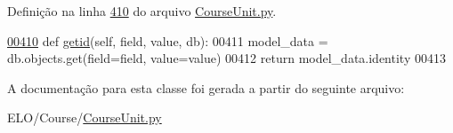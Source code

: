 Definição na linha \hyperlink{CourseUnit_8py_source_l00410}{410} do arquivo \hyperlink{CourseUnit_8py_source}{Course\+Unit.\+py}.


\begin{DoxyCode}
\hypertarget{classCourse_1_1CourseUnit_1_1PersCourse_l00410}{}\hyperlink{classCourse_1_1CourseUnit_1_1PersCourse_acfe23f8591380715d02d815193b30ca5}{00410}     \textcolor{keyword}{def }\hyperlink{classCourse_1_1CourseUnit_1_1PersCourse_acfe23f8591380715d02d815193b30ca5}{getid}(self, field, value, db):
00411         model\_data = db.objects.get(field=field, value=value)
00412         \textcolor{keywordflow}{return} model\_data.identity
00413 
\end{DoxyCode}


A documentação para esta classe foi gerada a partir do seguinte arquivo\+:\begin{DoxyCompactItemize}
\item 
E\+L\+O/\+Course/\hyperlink{CourseUnit_8py}{Course\+Unit.\+py}\end{DoxyCompactItemize}
